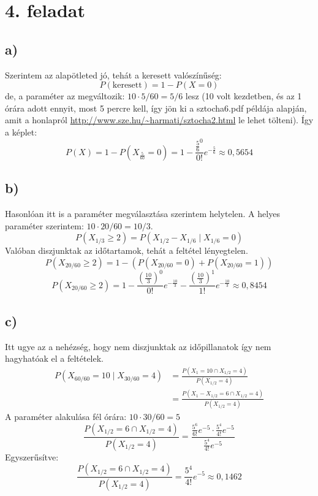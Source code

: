 \documentclass[a4paper,12pt]{article}   		%
\begin{document}
\section*{4. feladat}
\subsection*{a)}
Szerintem az alapötleted jó, tehát a keresett valószínűség:
\[P(\text{keresett}) = 1 - P(X = 0)\]
de, a paraméter az megváltozik: $10 \cdot 5/60 = 5/6$ lesz (10 volt kezdetben, 
és az 1 órára adott ennyit, most 5 percre kell, így jön ki a
\mbox{sztocha6.pdf} példája alapján, amit a honlapról 
\url{http://www.sze.hu/~harmati/sztocha2.html} le lehet tölteni). 
Így a képlet:
\[P(X) = 1 - P(X_\frac{5}{60} = 0) = 1 - \frac{\frac{5}{6}^0}{0!}
e^{-\frac{5}{6}} \approx 0,5654\]

\subsection*{b)}
Hasonlóan itt is a paraméter megválasztása szerintem helytelen. A helyes 
paraméter szerintem: $10 \cdot 20/60 = 10/3$.
\[P(X_{1/3} \geq 2) = P(X_{1/2}-X_{1/6} \mid X_{1/6}=0)\]
Valóban diszjunktak az időtartamok, tehát a feltétel lényegtelen.
\[
P(X_{20/60} \geq 2) = 1 - \left( P(X_{20/60} = 0)+P(X_{20/60} = 1)\right)
\]
\[
P(X_{20/60} \geq 2) = 1 - \frac{\left(\frac{10}{3}\right)^0}{0!}e^
{-\frac{10}{3}} - \frac{\left(\frac{10}{3}\right)^1}{1!}e^{-\frac{10}{3}} 
\approx 0,8454
\]

\subsection*{c)}
Itt ugye az a nehézség, hogy nem diszjunktak az időpillanatok így nem
hagyhatóak el a feltételek.
\begin{equation*}
\begin{split}
P(X_{60/60} = 10 \mid X_{30/60} = 4) &= \frac{P(X_1 = 10 \cap X_{1/2} = 4)}
{P(X_{1/2} = 4)} \\
&= \frac{P(X_1-X_{1/2} = 6 \cap X_{1/2} = 4)}{P(X_{1/2} = 4)}
\end{split}
\end{equation*}
A paraméter alakulása fél órára: $10 \cdot 30/60 = 5$
\[
\frac{P(X_{1/2} = 6 \cap X_{1/2} = 4)}{P(X_{1/2} = 4)} = \frac{\frac{5^6}{6!}
e^{-5} \cdot \frac{5^4}{4!} e^{-5}}{\frac{5^4}{4!} e^{-5}}
\]
Egyszerűsítve:
\[
\frac{P(X_{1/2} = 6 \cap X_{1/2} = 4)}{P(X_{1/2} = 4)} = 
\frac{5^4}{4!} e^{-5} \approx 0,1462
\]
\end{document}
